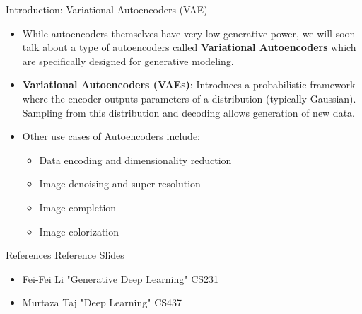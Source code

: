 \begin{frame}[allowframebreaks]{Introduction: Variational Autoencoders (VAE)}
\begin{itemize}
    \item While autoencoders themselves have very low generative power, we will soon talk about a type of autoencoders called \textbf{Variational Autoencoders} which are specifically designed for generative modeling.
    \item \textbf{Variational Autoencoders (VAEs)}: Introduces a probabilistic framework where the encoder outputs parameters of a distribution (typically Gaussian). Sampling from this distribution and decoding allows generation of new data.
    \item Other use cases of Autoencoders include:
    \begin{itemize}
        \item Data encoding and dimensionality reduction
        \item Image denoising and super-resolution
        \item Image completion
        \item Image colorization
    \end{itemize}
\end{itemize}

\end{frame}


\begin{frame}{References}
Reference Slides
\begin{itemize}
    \item Fei-Fei Li "Generative Deep Learning" CS231
    \item Murtaza Taj "Deep Learning" CS437
\end{itemize}
    
\end{frame}